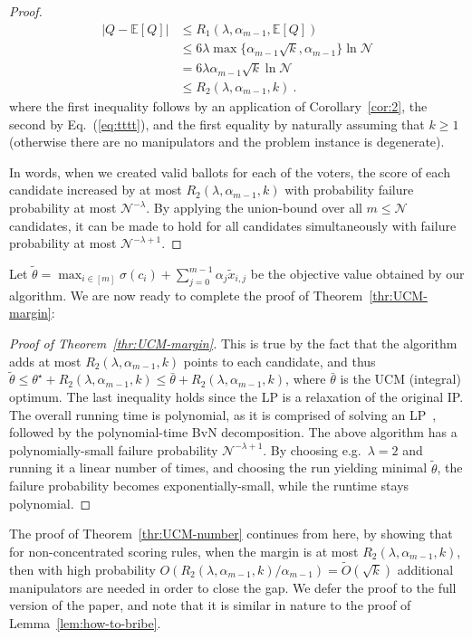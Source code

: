 \documentclass[letterpaper]{article} %
\newtheorem{corollary}[theorem]{Corollary}
\theoremstyle{definition}
\newcommand{\NN}{\mathcal{N}}
\newcommand{\EE}{\mathbb{E}}
\begin{document}
\begin{proof}
	\begin{align*}
\left\lvert Q - \EE[Q]\right\rvert &\leq R_1(\lambda,\alpha_{m-1},\EE[Q])\\
&\leq 6\lambda \max\{\alpha_{m-1}\sqrt{k}, \alpha_{m-1}\}\ln \NN\\
&= 6\lambda \alpha_{m-1} \sqrt{k} \ln \NN\\
&\leq R_2(\lambda, \alpha_{m-1},k)\ .
\end{align*}
where the first inequality follows by an application of Corollary~\ref{cor:2}, the second by Eq.~(\ref{eq:tttt}), and the first equality by naturally assuming that $k \geq 1$ (otherwise there are no manipulators and the problem instance is degenerate).


In words, when we created valid ballots for each of the voters, the score of each candidate increased by at most $R_2(\lambda, \alpha_{m-1},k)$ with probability failure probability at most $\NN^{-\lambda}$.  By applying the union-bound over all $m\leq \NN$ candidates, it can be made to hold for all candidates simultaneously  with failure probability at most $\NN^{-\lambda+1}$. 
\end{proof}
Let $\tilde{\theta}=\max_{i\in[m]}\sigma(c_i)+\sum_{j=0}^{m-1} \alpha_j \tilde{x}_{i,j}$ be the objective value obtained by our algorithm. We are now ready to complete the proof of Theorem~\ref{thr:UCM-margin}:
\begin{proof}[Proof of Theorem~\ref{thr:UCM-margin}]
	This is true by the fact that the algorithm adds  at most $R_2(\lambda, \alpha_{m-1},k)$ points to each candidate, and thus $\tilde{\theta} \leq \theta^\star + R_2(\lambda, \alpha_{m-1},k) \leq \bar{\theta} + R_2(\lambda, \alpha_{m-1},k)$, where $\bar{\theta}$ is the UCM (integral) optimum. The last inequality holds since the LP is a relaxation of the original IP. The overall running time is polynomial, as it is comprised of solving an LP~\cite{DBLP:journals/combinatorica/Karmarkar84}, followed by the polynomial-time BvN decomposition. 
	The above algorithm has a polynomially-small failure probability $\NN^{-\lambda+1}$. By choosing e.g.\ $\lambda=2$ and running it a linear number of times, and choosing the run yielding minimal $\tilde{\theta}$, the failure probability becomes exponentially-small, while the runtime stays polynomial.
\end{proof}
The proof of Theorem~\ref{thr:UCM-number} continues from here, by showing that for non-concentrated scoring rules, when the margin
is at most $R_2(\lambda, \alpha_{m-1},k)$, then with high probability $O(R_2(\lambda, \alpha_{m-1},k) / \alpha_{m-1}) = \widetilde{O}(\sqrt{k})$ additional manipulators are needed in order to close the gap. We defer the proof to the full version of the paper, and note that it is similar in nature to the proof of Lemma~\ref{lem:how-to-bribe}.
\end{document}
